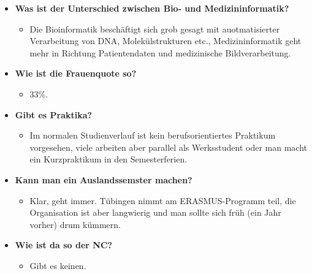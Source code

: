 \begin{large}
\begin{itemize}
		\item \textbf{Was ist der Unterschied zwischen Bio- und Medizininformatik?}
		\begin{itemize}
			\item Die Bioinformatik beschäftigt sich grob gesagt mit auotmatisierter Verarbeitung von DNA, Molekülstrukturen etc., Medizininformatik geht mehr in Richtung Patientendaten und medizinische Bildverarbeitung.
		\end{itemize}

	\item \textbf{Wie ist die Frauenquote so?}
	\begin{itemize}
		\item 33\%.
	\end{itemize}

	\item \textbf{Gibt es Praktika?}
	\begin{itemize}
		\item Im normalen Studienverlauf ist kein berufsorientiertes Praktikum vorgesehen, viele arbeiten aber parallel als Werksstudent oder man macht ein Kurzpraktikum in den Semesterferien.
	\end{itemize}

	\item \textbf{Kann man ein Auslandssemster machen?}
	\begin{itemize}
		\item  Klar, geht immer. Tübingen nimmt am ERASMUS-Programm teil, die Organisation ist aber langwierig und man sollte sich früh (ein Jahr vorher) drum kümmern.
	\end{itemize}

	\item \textbf{Wie ist da so der NC?}
	\begin{itemize}
		\item Gibt es keinen.
	\end{itemize}
\end{itemize}
	\end{large}